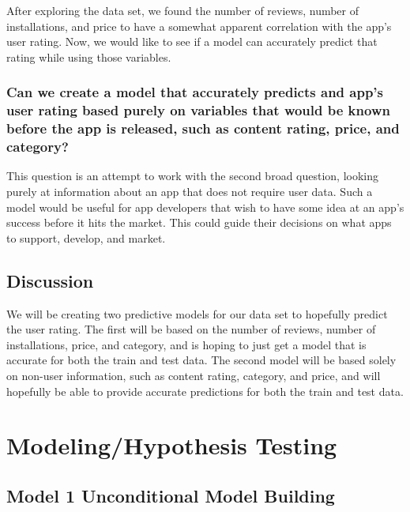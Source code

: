 \documentclass[]{article}
\begin{document}
After exploring the data set, we found the number of reviews, number of
installations, and price to have a somewhat apparent correlation with
the app's user rating. Now, we would like to see if a model can
accurately predict that rating while using those variables.

\subsubsection{Can we create a model that accurately predicts and app's
user rating based purely on variables that would be known before the app
is released, such as content rating, price, and
category?}\label{can-we-create-a-model-that-accurately-predicts-and-apps-user-rating-based-purely-on-variables-that-would-be-known-before-the-app-is-released-such-as-content-rating-price-and-category}

This question is an attempt to work with the second broad question,
looking purely at information about an app that does not require user
data. Such a model would be useful for app developers that wish to have
some idea at an app's success before it hits the market. This could
guide their decisions on what apps to support, develop, and market.

\subsection{Discussion}\label{discussion}

We will be creating two predictive models for our data set to hopefully
predict the user rating. The first will be based on the number of
reviews, number of installations, price, and category, and is hoping to
just get a model that is accurate for both the train and test data. The
second model will be based solely on non-user information, such as
content rating, category, and price, and will hopefully be able to
provide accurate predictions for both the train and test data.

\section{Modeling/Hypothesis Testing}\label{modelinghypothesis-testing}

\subsection{Model 1 Unconditional Model
Building}\label{model-1-unconditional-model-building}
\end{document}
